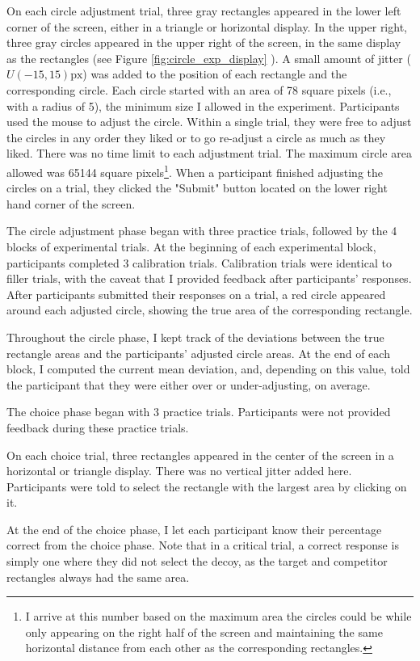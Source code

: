 On each circle adjustment trial, three gray rectangles appeared in the lower left corner of the screen, either in a triangle or horizontal display. In the upper right, three gray circles appeared in the upper right of the screen, in the same display as the rectangles (see Figure \ref{fig:circle_exp_display} ). A small amount of jitter ($U(-15,15)\text{px}$) was added to the position of each rectangle and the corresponding circle. Each circle started with an area of 78 square pixels (i.e., with a radius of 5), the minimum size I allowed in the experiment. Participants used the mouse to adjust the circle. Within a single trial, they were free to adjust the circles in any order they liked or to go re-adjust a circle as much as they liked. There was no time limit to each adjustment trial. The maximum circle area allowed was 65144 square pixels\footnote{I arrive at this number based on the maximum area the circles could be while only appearing on the right half of the screen and maintaining the same horizontal distance from each other as the corresponding rectangles.}. When a participant finished adjusting the circles on a trial, they clicked the "Submit" button located on the lower right hand corner of the screen. 

The circle adjustment phase began with three practice trials, followed by the 4 blocks of experimental trials. At the beginning of each experimental block, participants completed 3 calibration trials. Calibration trials were identical to filler trials, with the caveat that I provided feedback after participants' responses. After participants submitted their responses on a trial, a red circle appeared around each adjusted circle, showing the true area of the corresponding rectangle. 

Throughout the circle phase, I kept track of the deviations between the true rectangle areas and the participants' adjusted circle areas. At the end of each block, I computed the current mean deviation, and, depending on this value, told the participant that they were either over or under-adjusting, on average.

The choice phase began with 3 practice trials. Participants were not provided feedback during these practice trials. 

On each choice trial, three rectangles appeared in the center of the screen in a horizontal or triangle display. There was no vertical jitter added here. Participants were told to select the rectangle with the largest area by clicking on it.

At the end of the choice phase, I let each participant know their percentage correct from the choice phase. Note that in a critical trial, a correct response is simply one where they did not select the decoy, as the target and competitor rectangles always had the same area.

